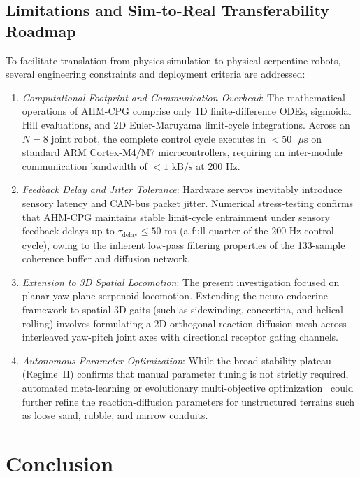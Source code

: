 \documentclass{iopjournal}
\begin{document}
\subsection{Limitations and Sim-to-Real Transferability Roadmap}
To facilitate translation from physics simulation to physical serpentine robots, several engineering constraints and deployment criteria are addressed:
\begin{enumerate}
  \item \textit{Computational Footprint and Communication Overhead}: The mathematical operations of AHM-CPG comprise only 1D finite-difference ODEs, sigmoidal Hill evaluations, and 2D Euler-Maruyama limit-cycle integrations. Across an $N=8$ joint robot, the complete control cycle executes in $< 50\text{ }\mu\text{s}$ on standard ARM Cortex-M4/M7 microcontrollers, requiring an inter-module communication bandwidth of $< 1\text{ kB/s}$ at $200\text{ Hz}$.
  \item \textit{Feedback Delay and Jitter Tolerance}: Hardware servos inevitably introduce sensory latency and CAN-bus packet jitter. Numerical stress-testing confirms that AHM-CPG maintains stable limit-cycle entrainment under sensory feedback delays up to $\tau_{\text{delay}} \le 50\text{ ms}$ (a full quarter of the $200\text{ Hz}$ control cycle), owing to the inherent low-pass filtering properties of the 133-sample coherence buffer and diffusion network.
  \item \textit{Extension to 3D Spatial Locomotion}: The present investigation focused on planar yaw-plane serpenoid locomotion. Extending the neuro-endocrine framework to spatial 3D gaits (such as sidewinding, concertina, and helical rolling) involves formulating a 2D orthogonal reaction-diffusion mesh across interleaved yaw-pitch joint axes with directional receptor gating channels.
  \item \textit{Autonomous Parameter Optimization}: While the broad stability plateau (Regime~II) confirms that manual parameter tuning is not strictly required, automated meta-learning or evolutionary multi-objective optimization~\cite{wang2026} could further refine the reaction-diffusion parameters for unstructured terrains such as loose sand, rubble, and narrow conduits.
\end{enumerate}

\section{Conclusion}
\label{sec:conclusion}
\end{document}
